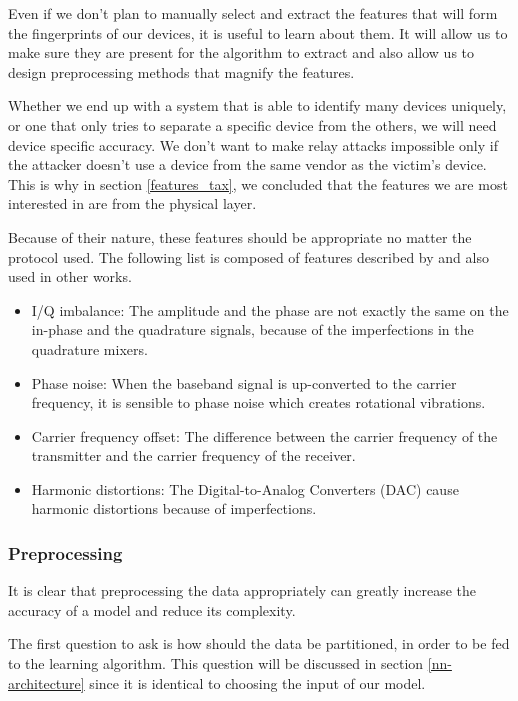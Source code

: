Even if we don't plan to manually select and extract the features that will form the fingerprints of our devices, it is useful to learn about them. It will allow us to make sure they are present for the algorithm to extract and also allow us to design preprocessing methods that magnify the features.

Whether we end up with a system that is able to identify many devices uniquely, or one that only tries to separate a specific device from the others, we will need device specific accuracy. We don't want to make relay attacks impossible only if the attacker doesn't use a device from the same vendor as the victim's device. This is why in section \ref{features_tax}, we concluded that the features we are most interested in are from the physical layer.

Because of their nature, these features should be appropriate no matter the protocol used. The following list is composed of features described by \textcite{riyaz_deep_2018} and also used in other works.

\begin{itemize}
  \item{I/Q imbalance:} The amplitude and the phase are not exactly the same on the in-phase and the quadrature signals, because of the imperfections in the quadrature mixers.
  \item{Phase noise:} When the baseband signal is up-converted to the carrier frequency, it is sensible to phase noise which creates rotational vibrations.
  \item{Carrier frequency offset:} The difference between the carrier frequency of the transmitter and the carrier frequency of the receiver.
  \item{Harmonic distortions:} The Digital-to-Analog Converters (DAC) cause harmonic distortions because of imperfections.
\end{itemize}

\subsubsection{Preprocessing}

It is clear that preprocessing the data appropriately can greatly increase the accuracy of a model and reduce its complexity.

The first question to ask is how should the data be partitioned, in order to be fed to the learning algorithm. This question will be discussed in section \ref{nn-architecture} since it is identical to choosing the input of our model.

